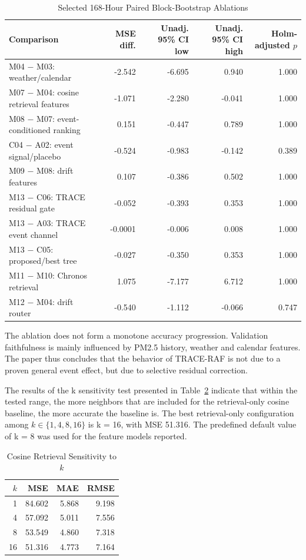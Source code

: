 \documentclass{ieeeaccess}
\begin{document}
\begin{table}[!t]
\centering
\caption{Selected 168-Hour Paired Block-Bootstrap Ablations}
\label{tab:ablation_results}
\begin{tabular}{lrrrr}
\toprule
Comparison & MSE diff. & Unadj. 95\% CI low & Unadj. 95\% CI high & Holm-adjusted $p$ \\
\midrule
M04 $-$ M03: weather/calendar & -2.542 & -6.695 & 0.940 & 1.000 \\
M07 $-$ M04: cosine retrieval features & -1.071 & -2.280 & -0.041 & 1.000 \\
M08 $-$ M07: event-conditioned ranking & 0.151 & -0.447 & 0.789 & 1.000 \\
C04 $-$ A02: event signal/placebo & -0.524 & -0.983 & -0.142 & 0.389 \\
M09 $-$ M08: drift features & 0.107 & -0.386 & 0.502 & 1.000 \\
M13 $-$ C06: TRACE residual gate & -0.052 & -0.393 & 0.353 & 1.000 \\
M13 $-$ A03: TRACE event channel & -0.0001 & -0.006 & 0.008 & 1.000 \\
M13 $-$ C05: proposed/best tree & -0.027 & -0.350 & 0.353 & 1.000 \\
M11 $-$ M10: Chronos retrieval & 1.075 & -7.177 & 6.712 & 1.000 \\
M12 $-$ M04: drift router & -0.540 & -1.112 & -0.066 & 0.747 \\
\bottomrule
\end{tabular}
\end{table}

The ablation does not form a monotone accuracy progression. Validation faithfulness is mainly influenced by PM2.5 history, weather and calendar features. The paper thus concludes that the behavior of TRACE-RAF is not due to a proven general event effect, but due to selective residual correction.

The results of the k sensitivity test presented in Table~\ref{tab:k_sensitivity} indicate that within the tested range, the more neighbors that are included for the retrieval-only cosine baseline, the more accurate the baseline is. The best retrieval-only configuration among $k \in \{1, 4, 8, 16\}$ is k = 16, with MSE 51.316. The predefined default value of k = 8 was used for the feature models reported.

\begin{table}[!t]
\centering
\caption{Cosine Retrieval Sensitivity to $k$}
\label{tab:k_sensitivity}
\begin{tabular}{rrrr}
\toprule
$k$ & MSE & MAE & RMSE \\
\midrule
1 & 84.602 & 5.868 & 9.198 \\
4 & 57.092 & 5.011 & 7.556 \\
8 & 53.549 & 4.860 & 7.318 \\
16 & 51.316 & 4.773 & 7.164 \\
\bottomrule
\end{tabular}
\end{table}
\end{document}
